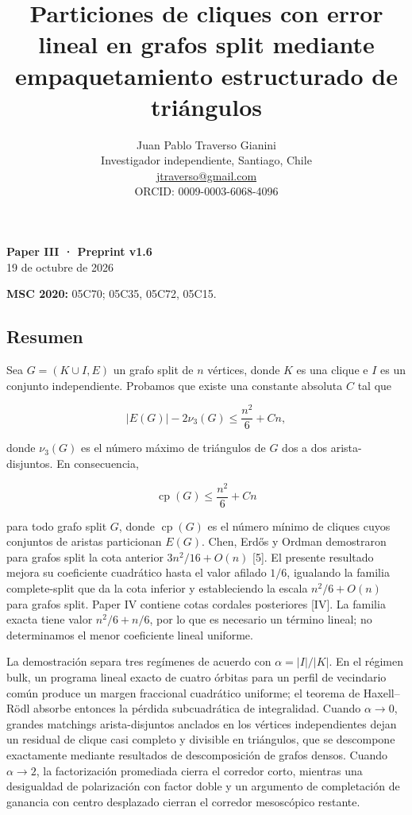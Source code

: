 \documentclass[spanish,11pt,a4paper]{article}
\title{Particiones de cliques con error lineal en grafos split mediante empaquetamiento estructurado de triángulos}
\author{Juan Pablo Traverso Gianini\\\small Investigador independiente, Santiago, Chile\\\small \href{mailto:jtraverso@gmail.com}{jtraverso@gmail.com}\\\small ORCID: 0009-0003-6068-4096}
\date{}
\begin{document}
\raggedbottom
\maketitle
\textbf{Paper III · Preprint v1.6}\\
19 de octubre de 2026

\textbf{MSC 2020:} 05C70; 05C35, 05C72, 05C15.

\subsection{Resumen}\label{resumen}

Sea \(G=(K\cup I,E)\) un grafo split de \(n\) vértices, donde \(K\) es
una clique e \(I\) es un conjunto independiente. Probamos que existe una
constante absoluta \(C\) tal que

\[
|E(G)|-2\nu_3(G)
\le
\frac{n^2}{6}+Cn,
\]

donde \(\nu_3(G)\) es el número máximo de triángulos de \(G\) dos a dos
arista-disjuntos. En consecuencia,

\[
\operatorname{cp}(G)
\le
\frac{n^2}{6}+Cn
\]

para todo grafo split \(G\), donde \(\operatorname{cp}(G)\) es el número
mínimo de cliques cuyos conjuntos de aristas particionan \(E(G)\). Chen,
Erdős y Ordman demostraron para grafos split la cota anterior
\(3n^2/16+O(n)\) {[}5{]}. El presente resultado mejora su coeficiente
cuadrático hasta el valor afilado \(1/6\), igualando la familia
complete-split que da la cota inferior y estableciendo la escala
\(n^2/6+O(n)\) para grafos split. Paper IV contiene cotas cordales
posteriores {[}IV{]}. La familia exacta tiene valor \(n^2/6+n/6\), por
lo que es necesario un término lineal; no determinamos el menor
coeficiente lineal uniforme.

La demostración separa tres regímenes de acuerdo con \(\alpha=|I|/|K|\).
En el régimen bulk, un programa lineal exacto de cuatro órbitas para un
perfil de vecindario común produce un margen fraccional cuadrático
uniforme; el teorema de Haxell--Rödl absorbe entonces la pérdida
subcuadrática de integralidad. Cuando \(\alpha\to0\), grandes matchings
arista-disjuntos anclados en los vértices independientes dejan un
residual de clique casi completo y divisible en triángulos, que se
descompone exactamente mediante resultados de descomposición de grafos
densos. Cuando \(\alpha\to2\), la factorización promediada cierra el
corredor corto, mientras una desigualdad de polarización con factor
doble y un argumento de completación de ganancia con centro desplazado
cierran el corredor mesoscópico restante.
\end{document}
